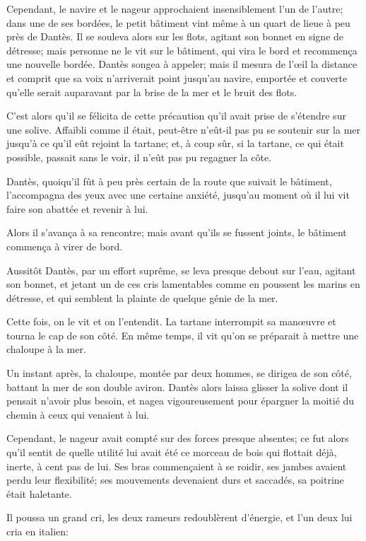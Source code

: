 Cependant, le navire et le nageur approchaient insensiblement l'un de l'autre; dans une de ses bordées, le petit bâtiment vint même à un quart de lieue à peu près de Dantès. Il se souleva alors sur les flots, agitant son bonnet en signe de détresse; mais personne ne le vit sur le bâtiment, qui vira le bord et recommença une nouvelle bordée. Dantès songea à appeler; mais il mesura de l'œil la distance et comprit que sa voix n'arriverait point jusqu'au navire, emportée et couverte qu'elle serait auparavant par la brise de la mer et le bruit des flots.

C'est alors qu'il se félicita de cette précaution qu'il avait prise de s'étendre sur une solive. Affaibli comme il était, peut-être n'eût-il pas pu se soutenir sur la mer jusqu'à ce qu'il eût rejoint la tartane; et, à coup sûr, si la tartane, ce qui était possible, passait sans le voir, il n'eût pas pu regagner la côte.

Dantès, quoiqu'il fût à peu près certain de la route que suivait le bâtiment, l'accompagna des yeux avec une certaine anxiété, jusqu'au moment où il lui vit faire son abattée et revenir à lui.

Alors il s'avança à sa rencontre; mais avant qu'ils se fussent joints, le bâtiment commença à virer de bord.

Aussitôt Dantès, par un effort suprême, se leva presque debout sur l'eau, agitant son bonnet, et jetant un de ces cris lamentables comme en poussent les marins en détresse, et qui semblent la plainte de quelque génie de la mer.

Cette fois, on le vit et on l'entendit. La tartane interrompit sa manœuvre et tourna le cap de son côté. En même temps, il vit qu'on se préparait à mettre une chaloupe à la mer.

Un instant après, la chaloupe, montée par deux hommes, se dirigea de son côté, battant la mer de son double aviron. Dantès alors laissa glisser la solive dont il pensait n'avoir plus besoin, et nagea vigoureusement pour épargner la moitié du chemin à ceux qui venaient à lui.

Cependant, le nageur avait compté sur des forces presque absentes; ce fut alors qu'il sentit de quelle utilité lui avait été ce morceau de bois qui flottait déjà, inerte, à cent pas de lui. Ses bras commençaient à se roidir, ses jambes avaient perdu leur flexibilité; ses mouvements devenaient durs et saccadés, sa poitrine était haletante.

Il poussa un grand cri, les deux rameurs redoublèrent d'énergie, et l'un deux lui cria en italien:

